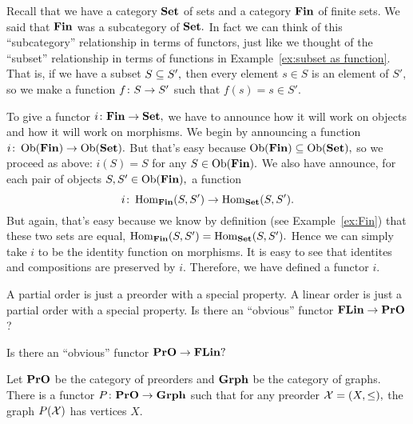 \documentclass[../main/CT4S-EN-RU]{subfiles}
\begin{document}
\begin{exampleENG}
Recall that we have a category $\Set$ of sets and a category $\Fin$ of finite sets. We said that $\Fin$ was a subcategory of $\Set.$ In fact we can think of this “subcategory” relationship in terms of functors, just like we thought of the “subset” relationship in terms of functions in Example~\ref{ex:subset as function}. That is, if we have a subset $S\ss S',$ then every element $s\in S$ is an element of $S',$ so we make a function $f\taking S\to S'$ such that $f(s)=s\in S'.$ 

To give a functor $i\taking\Fin\to\Set,$ we have to announce how it will work on objects and how it will work on morphisms. We begin by announcing a function $i\taking\Ob(\Fin)\to\Ob(\Set).$ But that's easy because $\Ob(\Fin)\ss\Ob(\Set),$ so we proceed as above: $i(S)=S$ for any $S\in\Ob(\Fin).$ We also have announce, for each pair of objects $S,S'\in\Ob(\Fin),$ a function $$i\taking\Hom_\Fin(S,S')\to\Hom_\Set(S,S').$$ But again, that's easy because we know by definition (see Example~\ref{ex:Fin}) that these two sets are equal, $\Hom_\Fin(S,S')=\Hom_\Set(S,S').$ Hence we can simply take $i$ to be the identity function on morphisms. It is easy to see that identites and compositions are preserved by $i.$ Therefore, we have defined a functor $i.$
\end{exampleENG}

\begin{exampleRUS}
\end{exampleRUS}

\begin{exerciseENG}
A partial order is just a preorder with a special property. A linear order is just a partial order with a special property.
\sexc Is there an “obvious” functor $\FLin\to\PrO$?
\item Is there an “obvious” functor $\PrO\to\FLin?$
\endsexc
\end{exerciseENG}

\begin{exerciseRUS}
\end{exerciseRUS}

\begin{propositionENG}\label{prop:pro to grph}
Let $\PrO$ be the category of preorders and $\Grph$ be the category of graphs. There is a functor $P\taking\PrO\to\Grph$ such that for any preorder $\mcX=(X,\leq),$ the graph $P(\mcX)$ has vertices $X.$
\end{propositionENG}
\end{document}
